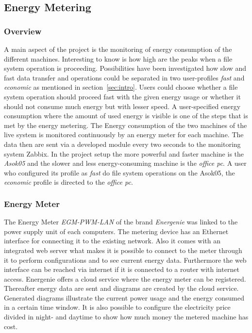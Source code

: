 \subsection{Energy Metering}

\subsubsection{Overview}
A main aspect of the project is the monitoring of energy consumption of the different machines. Interesting to know is how high are the peaks when a file system operation is proceeding. Possibilities have been investigated how slow and fast data transfer and operations could be separated in two user-profiles \textit{fast} and \textit{economic} as mentioned in section~\ref{sec:intro}. Users could choose whether a file system operation should proceed fast with the given energy usage or whether it should not consume much energy but with lesser speed. A user-specified energy consumption where the amount of used energy is visible is one of the steps that is met by the energy metering. The Energy consumption of the two machines of the live system is monitored continuously by an energy meter for each machine. The data then are sent via a developed module every two seconds to the monitoring system Zabbix. In the project setup the more powerful and faster machine is the \textit{Asok05} and the slower and less energy-consuming machine is the \textit{office pc}. A user who configured its profile as \textit{fast} do file system operations on the Asok05, the \textit{economic} profile is directed to the \textit{office pc}.

\subsubsection{Energy Meter}
\label{sec:EnergyMeter}
The Energy Meter \textit{EGM-PWM-LAN} of the brand \textit{Energenie} was linked to the power supply unit of each computers. The metering device has an Ethernet interface for connecting it to the existing network. Also it comes with an integrated web server what makes it is possible to connect to the meter through it to perform configurations and to see current energy data. Furthermore the web interface can be reached via internet if it is connected to a router with internet access. Energenie offers a cloud service \cite{Energenie.2014} where the energy meter can be registered. Thereafter energy data are sent and diagrams are created by the cloud service. Generated diagrams illustrate the current power usage and the energy consumed in a certain time window. It is also possible to configure the electricity price divided in night- and daytime to show how much money the metered machine has cost.

